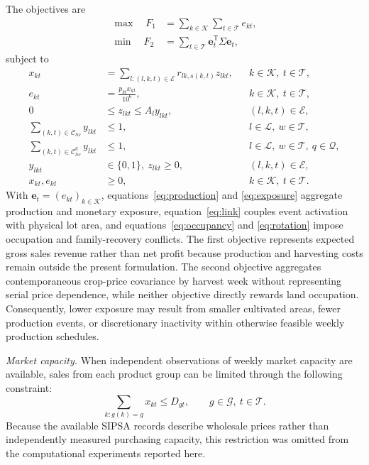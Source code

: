\documentclass[]{interact}
\newcommand{\Lset}{\mathcal{L}}
\newcommand{\Kset}{\mathcal{K}}
\newcommand{\Tset}{\mathcal{T}}
\newcommand{\Eset}{\mathcal{E}}
\newcommand{\Gset}{\mathcal{G}}
\newcommand{\Qset}{\mathcal{Q}}
\begin{document}
The objectives are
\begin{align}
\max\quad F_1 &= \sum_{k\in\Kset}\sum_{t\in\Tset}e_{kt}, \label{eq:revenue}\\
\min\quad F_2 &= \sum_{t\in\Tset}\mathbf e_t^{\mathsf T}\Sigma\mathbf e_t, \label{eq:risk}
\end{align}
subject to
\begin{align}
x_{kt} &= \sum_{l:(l,k,t)\in\Eset} r_{lk,s(k,t)}z_{lkt}, && k\in\Kset,\ t\in\Tset, \label{eq:production}\\
e_{kt} &= \frac{p_{kt}x_{kt}}{10^6}, && k\in\Kset,\ t\in\Tset, \label{eq:exposure}\\
0&\le z_{lkt}\le A_l y_{lkt}, && (l,k,t)\in\Eset, \label{eq:link}\\
\sum_{(k,t)\in\mathcal C_{lw}}y_{lkt}&\le1, && l\in\Lset,\ w\in\Tset, \label{eq:occupancy}\\
\sum_{(k,t)\in\mathcal C^q_{lw}}y_{lkt}&\le1, && l\in\Lset,\ w\in\Tset,\ q\in\Qset, \label{eq:rotation}\\
y_{lkt}&\in\{0,1\},\ z_{lkt}\ge0, && (l,k,t)\in\Eset, \nonumber\\
x_{kt},e_{kt}&\ge0, && k\in\Kset,\ t\in\Tset. \nonumber
\end{align}
With $\mathbf e_t=(e_{kt})_{k\in\Kset}$, equations~\eqref{eq:production} and \eqref{eq:exposure} aggregate production and monetary exposure, equation~\eqref{eq:link} couples event activation with physical lot area, and equations~\eqref{eq:occupancy} and \eqref{eq:rotation} impose occupation and family-recovery conflicts. The first objective represents expected gross sales revenue rather than net profit because production and harvesting costs remain outside the present formulation. The second objective aggregates contemporaneous crop-price covariance by harvest week without representing serial price dependence, while neither objective directly rewards land occupation. Consequently, lower exposure may result from smaller cultivated areas, fewer production events, or discretionary inactivity within otherwise feasible weekly production schedules.

\noindent\textit{Market capacity.}
When independent observations of weekly market capacity are available, sales from each product group can be limited through the following constraint:
\begin{equation}
\sum_{k:g(k)=g}x_{kt}\le D_{gt},\qquad g\in\Gset,\ t\in\Tset. \label{eq:optional-demand}
\end{equation}
Because the available SIPSA records describe wholesale prices rather than independently measured purchasing capacity, this restriction was omitted from the computational experiments reported here.
\end{document}
